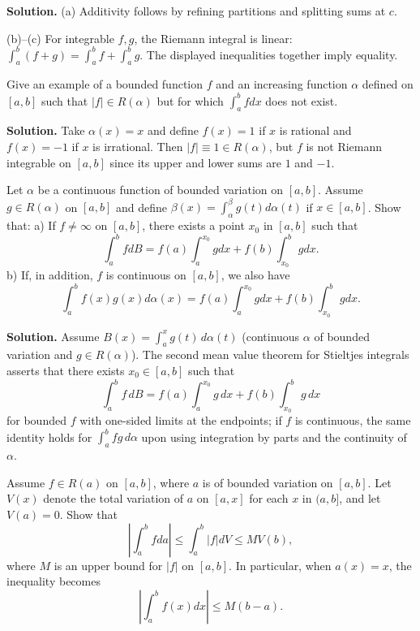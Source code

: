 \noindent\textbf{Solution.}
(a) Additivity follows by refining partitions and splitting sums at $c$.

(b)–(c) For integrable $f,g$, the Riemann integral is linear: $\int_a^b(f+g)=\int_a^b f+\int_a^b g$. The displayed inequalities together imply equality.
\medskip

\begin{problembox}
Give an example of a bounded function $f$ and an increasing function $\alpha$ defined on $[a, b]$ such that $|f| \in R(\alpha)$ but for which $\int_{a}^{b} f dx$ does not exist.
\end{problembox}

\noindent\textbf{Solution.}
Take $\alpha(x)=x$ and define $f(x)=1$ if $x$ is rational and $f(x)=-1$ if $x$ is irrational. Then $|f|\equiv 1\in R(\alpha)$, but $f$ is not Riemann integrable on $[a,b]$ since its upper and lower sums are $1$ and $-1$.
\medskip

\begin{problembox}
Let $\alpha$ be a continuous function of bounded variation on $[a, b]$. Assume $g \in R(\alpha)$ on $[a, b]$ and define $\beta(x) = \int_{\alpha}^{\beta} g(t) d\alpha(t)$ if $x \in [a, b]$. Show that:
a) If $f \neq \infty$ on $[a, b]$, there exists a point $x_0$ in $[a, b]$ such that
\[\int_{a}^{b} f dB = f(a) \int_{a}^{x_0} g dx + f(b) \int_{x_0}^{b} g dx.\]
b) If, in addition, $f$ is continuous on $[a, b]$, we also have
\[\int_{a}^{b} f(x)g(x) d\alpha(x) = f(a) \int_{a}^{x_0} g dx + f(b) \int_{x_0}^{b} g dx.\]
\end{problembox}

\noindent\textbf{Solution.}
Assume $B(x)=\int_a^x g(t)\,d\alpha(t)$ (continuous $\alpha$ of bounded variation and $g\in R(\alpha)$). The second mean value theorem for Stieltjes integrals asserts that there exists $x_0\in[a,b]$ such that
\[\int_a^b f\,dB = f(a)\int_a^{x_0} g\,dx + f(b)\int_{x_0}^b g\,dx\]
for bounded $f$ with one-sided limits at the endpoints; if $f$ is continuous, the same identity holds for $\int_a^b f g\,d\alpha$ upon using integration by parts and the continuity of $\alpha$.
\medskip

\begin{problembox}
Assume $f \in R(a)$ on $[a, b]$, where $a$ is of bounded variation on $[a, b]$. Let $V(x)$ denote the total variation of $a$ on $[a, x]$ for each $x$ in $(a, b]$, and let $V(a) = 0$. Show that
\[\left| \int_a^b f da \right| \leq \int_a^b |f| dV \leq MV(b),\]
where $M$ is an upper bound for $|f|$ on $[a, b]$. In particular, when $a(x) = x$, the inequality becomes
\[\left| \int_a^b f(x) dx \right| \leq M(b - a).\]
\end{problembox}


